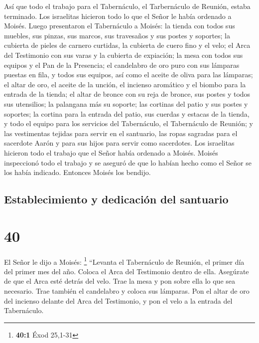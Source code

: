  Así que todo el trabajo para el Tabernáculo, el
Tarbernáculo de Reunión, estaba terminado. Los israelitas hicieron todo
lo que el Señor le había ordenado a Moisés.  Luego
presentaron el Tabernáculo a Moisés: la tienda con todos sus muebles,
sus pinzas, sus marcos, sus travesaños y sus postes y soportes;
 la cubierta de pieles de carnero curtidas, la cubierta
de cuero fino y el velo;  el Arca del Testimonio con sus
varas y la cubierta de expiación;  la mesa con todos sus
equipos y el Pan de la Presencia;  el candelabro de oro
puro con sus lámparas puestas en fila, y todos sus equipos, así como el
aceite de oliva para las lámparas;  el altar de oro, el
aceite de la unción, el incienso aromático y el biombo para la entrada
de la tienda;  el altar de bronce con su reja de bronce,
sus postes y todos sus utensilios; la palangana más su soporte;
 las cortinas del patio y sus postes y soportes; la
cortina para la entrada del patio, sus cuerdas y estacas de la tienda, y
todo el equipo para los servicios del Tabernáculo, el Tabernáculo de
Reunión;  y las vestimentas tejidas para servir en el
santuario, las ropas sagradas para el sacerdote Aarón y para sus hijos
para servir como sacerdotes.  Los israelitas hicieron
todo el trabajo que el Señor había ordenado a Moisés. 
Moisés inspeccionó todo el trabajo y se aseguró de que lo habían hecho
como el Señor se los había indicado. Entonces Moisés los bendijo.

\hypertarget{establecimiento-y-dedicaciuxf3n-del-santuario}{%
\subsection{Establecimiento y dedicación del
santuario}\label{establecimiento-y-dedicaciuxf3n-del-santuario}}

\hypertarget{section-39}{%
\section{40}\label{section-39}}

 El Señor le dijo a Moisés: \footnote{\textbf{40:1} Éxod
  25,1-31}  ``Levanta el Tabernáculo de Reunión, el primer
día del primer mes del año.  Coloca el Arca del Testimonio
dentro de ella. Asegúrate de que el Arca esté detrás del velo.
 Trae la mesa y pon sobre ella lo que sea necesario. Trae
también el candelabro y coloca sus lámparas.  Pon el altar
de oro del incienso delante del Arca del Testimonio, y pon el velo a la
entrada del Tabernáculo.

